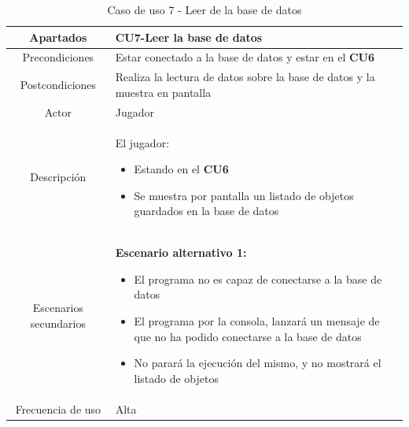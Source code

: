 \documentclass[a4paper]{article}
\begin{document}
\begin{table}[!ht]
    \centering
    \begin{tabular}{|c|p{12cm}|}
        \hline
        \textbf{Apartados}     & \textbf{CU7-Leer la base de datos}                                           \\
        \hline
        Precondiciones         & Estar conectado a la base de datos y estar en el \textbf{CU6}                \\
        \hline
        Postcondiciones        & Realiza la lectura de datos sobre la base de datos y la muestra en pantalla  \\
        \hline
        Actor                  & Jugador                                                                      \\
        \hline
        Descripción            & El jugador:
        \begin{itemize}
            \item Estando en el \textbf{CU6}
            \item[\faAngleRight] Se muestra por pantalla un listado de objetos guardados en la base de datos
        \end{itemize}       \\
        \hline
        Escenarios secundarios & \textbf{Escenario alternativo 1:}
        \begin{itemize}
            \item El programa no es capaz de conectarse a la base de datos
            \item El programa por la consola, lanzará un mensaje de que no ha podido conectarse a la base de datos
            \item No parará la ejecución del mismo, y no mostrará el listado de objetos
        \end{itemize} \\
        \hline
        Frecuencia de uso      & Alta                                                                         \\
        \hline
    \end{tabular}
    \caption{Caso de uso 7 - Leer de la base de datos}
    \label{tab:casosdeuso7-table}
\end{table}
\end{document}
